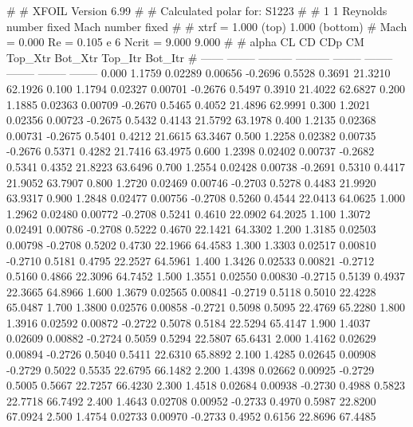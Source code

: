 #  
#       XFOIL         Version 6.99
#  
# Calculated polar for: S1223                                           
#  
# 1 1 Reynolds number fixed          Mach number fixed         
#  
# xtrf =   1.000 (top)        1.000 (bottom)  
# Mach =   0.000     Re =     0.105 e 6     Ncrit =   9.000  9.000
#  
#   alpha    CL        CD       CDp       CM     Top_Xtr  Bot_Xtr  Top_Itr  Bot_Itr
#  ------ -------- --------- --------- -------- -------- -------- -------- --------
   0.000   1.1759   0.02289   0.00656  -0.2696   0.5528   0.3691  21.3210  62.1926
   0.100   1.1794   0.02327   0.00701  -0.2676   0.5497   0.3910  21.4022  62.6827
   0.200   1.1885   0.02363   0.00709  -0.2670   0.5465   0.4052  21.4896  62.9991
   0.300   1.2021   0.02356   0.00723  -0.2675   0.5432   0.4143  21.5792  63.1978
   0.400   1.2135   0.02368   0.00731  -0.2675   0.5401   0.4212  21.6615  63.3467
   0.500   1.2258   0.02382   0.00735  -0.2676   0.5371   0.4282  21.7416  63.4975
   0.600   1.2398   0.02402   0.00737  -0.2682   0.5341   0.4352  21.8223  63.6496
   0.700   1.2554   0.02428   0.00738  -0.2691   0.5310   0.4417  21.9052  63.7907
   0.800   1.2720   0.02469   0.00746  -0.2703   0.5278   0.4483  21.9920  63.9317
   0.900   1.2848   0.02477   0.00756  -0.2708   0.5260   0.4544  22.0413  64.0625
   1.000   1.2962   0.02480   0.00772  -0.2708   0.5241   0.4610  22.0902  64.2025
   1.100   1.3072   0.02491   0.00786  -0.2708   0.5222   0.4670  22.1421  64.3302
   1.200   1.3185   0.02503   0.00798  -0.2708   0.5202   0.4730  22.1966  64.4583
   1.300   1.3303   0.02517   0.00810  -0.2710   0.5181   0.4795  22.2527  64.5961
   1.400   1.3426   0.02533   0.00821  -0.2712   0.5160   0.4866  22.3096  64.7452
   1.500   1.3551   0.02550   0.00830  -0.2715   0.5139   0.4937  22.3665  64.8966
   1.600   1.3679   0.02565   0.00841  -0.2719   0.5118   0.5010  22.4228  65.0487
   1.700   1.3800   0.02576   0.00858  -0.2721   0.5098   0.5095  22.4769  65.2280
   1.800   1.3916   0.02592   0.00872  -0.2722   0.5078   0.5184  22.5294  65.4147
   1.900   1.4037   0.02609   0.00882  -0.2724   0.5059   0.5294  22.5807  65.6431
   2.000   1.4162   0.02629   0.00894  -0.2726   0.5040   0.5411  22.6310  65.8892
   2.100   1.4285   0.02645   0.00908  -0.2729   0.5022   0.5535  22.6795  66.1482
   2.200   1.4398   0.02662   0.00925  -0.2729   0.5005   0.5667  22.7257  66.4230
   2.300   1.4518   0.02684   0.00938  -0.2730   0.4988   0.5823  22.7718  66.7492
   2.400   1.4643   0.02708   0.00952  -0.2733   0.4970   0.5987  22.8200  67.0924
   2.500   1.4754   0.02733   0.00970  -0.2733   0.4952   0.6156  22.8696  67.4485
